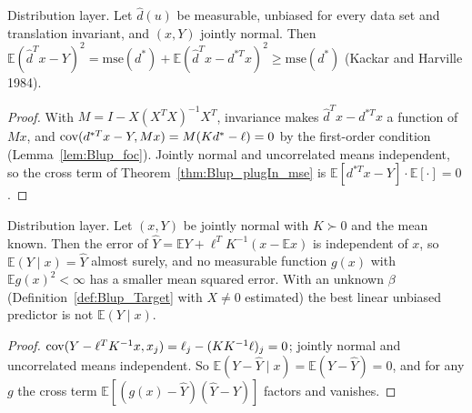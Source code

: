\begin{theorem}\label{thm:Blup_plugIn_normal}
  \leanok
  Distribution layer. Let $\hat d(u)$ be measurable, unbiased for every data set and translation
  invariant, and $(x, Y)$ jointly normal. Then
  $\mathbb E(\hat d^Tx - Y)^2 = \mathrm{mse}(d^*) + \mathbb E(\hat d^Tx - d^{*T}x)^2
  \ge \mathrm{mse}(d^*)$ (Kackar and Harville 1984).
\end{theorem}
\begin{proof}
  \leanok
  With $M = I - X(X^TX)^{-1}X^T$, invariance makes $\hat d^Tx - d^{*T}x$ a function of $Mx$, and
  $\operatorname{cov}(d^{*T}x - Y, Mx) = M(Kd^* - \ell) = 0$ by the first-order condition
  (Lemma~\ref{lem:Blup_foc}). Jointly normal and uncorrelated means independent, so the cross
  term of Theorem~\ref{thm:Blup_plugIn_mse} is $\mathbb E[d^{*T}x - Y]\cdot\mathbb E[\cdot] = 0$.
\end{proof}

\begin{theorem}\label{thm:Blup_condExp_normal}
  \leanok
  Distribution layer. Let $(x, Y)$ be jointly normal with $K \succ 0$ and the mean known. Then
  the error of $\hat Y = \mathbb EY + \ell^TK^{-1}(x - \mathbb Ex)$ is independent of $x$, so
  $\mathbb E(Y\mid x) = \hat Y$ almost surely, and no measurable function $g(x)$ with
  $\mathbb E g(x)^2 < \infty$ has a smaller mean squared error. With an unknown $\beta$
  (Definition~\ref{def:Blup_Target} with $X \ne 0$ estimated) the best linear unbiased predictor is
  not $\mathbb E(Y\mid x)$.
\end{theorem}
\begin{proof}
  \leanok
  $\operatorname{cov}(Y - \ell^TK^{-1}x, x_j) = \ell_j - (KK^{-1}\ell)_j = 0$; jointly normal and uncorrelated
  means independent. So $\mathbb E(Y - \hat Y\mid x) = \mathbb E(Y - \hat Y) = 0$, and for any $g$
  the cross term $\mathbb E[(g(x) - \hat Y)(\hat Y - Y)]$ factors and vanishes.
\end{proof}

